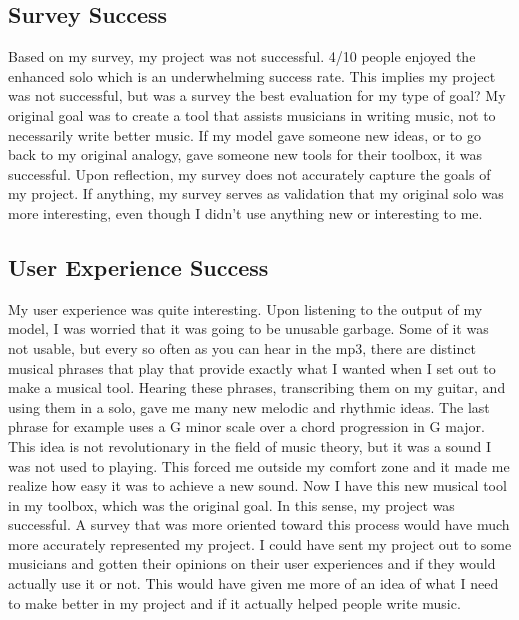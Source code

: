 \documentclass[10pt,twocolumn]{article}
\begin{document}
    \subsection{Survey Success}
        Based on my survey, my project was not successful. 4/10 people enjoyed the enhanced solo which is an underwhelming success rate. This implies my project was not successful, but was a survey the best evaluation for my type of goal? My original goal was to create a tool that assists musicians in writing music, not to necessarily write better music. If my model gave someone new ideas, or to go back to my original analogy, gave someone new tools for their toolbox, it was successful. Upon reflection, my survey does not accurately capture the goals of my project. If anything, my survey serves as validation that my original solo was more interesting, even though I didn't use anything new or interesting to me.

    \subsection{User Experience Success}
        My user experience was quite interesting. Upon listening to the output of my model, I was worried that it was going to be unusable garbage. Some of it was not usable, but every so often as you can hear in the mp3, there are distinct musical phrases that play that provide exactly what I wanted when I set out to make a musical tool. Hearing these phrases, transcribing them on my guitar, and using them in a solo, gave me many new melodic and rhythmic ideas. The last phrase for example uses a G minor scale over a chord progression in G major. This idea is not revolutionary in the field of music theory, but it was a sound I was not used to playing. This forced me outside my comfort zone and it made me realize how easy it was to achieve a new sound. Now I have this new musical tool in my toolbox, which was the original goal. In this sense, my project was successful. A survey that was more oriented toward this process would have much more accurately represented my project. I could have sent my project out to some musicians and gotten their opinions on their user experiences and if they would actually use it or not. This would have given me more of an idea of what I need to make better in my project and if it actually helped people write music.
\end{document}
